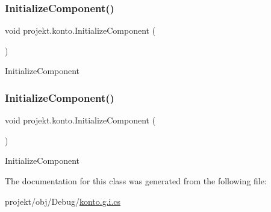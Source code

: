 \subsubsection{\texorpdfstring{Initialize\+Component()}{InitializeComponent()}\hspace{0.1cm}{\footnotesize\ttfamily [1/2]}}
{\footnotesize\ttfamily void projekt.\+konto.\+Initialize\+Component (\begin{DoxyParamCaption}{ }\end{DoxyParamCaption})\hspace{0.3cm}{\ttfamily [inline]}}



Initialize\+Component 

\mbox{\label{classprojekt_1_1konto_a7747c72ea9656125d46223a6930f86cf}} 
\subsubsection{\texorpdfstring{Initialize\+Component()}{InitializeComponent()}\hspace{0.1cm}{\footnotesize\ttfamily [2/2]}}
{\footnotesize\ttfamily void projekt.\+konto.\+Initialize\+Component (\begin{DoxyParamCaption}{ }\end{DoxyParamCaption})\hspace{0.3cm}{\ttfamily [inline]}}



Initialize\+Component 



The documentation for this class was generated from the following file\+:\begin{DoxyCompactItemize}
\item 
projekt/obj/\+Debug/\mbox{\hyperlink{_debug_2konto_8g_8i_8cs}{konto.\+g.\+i.\+cs}}\end{DoxyCompactItemize}
